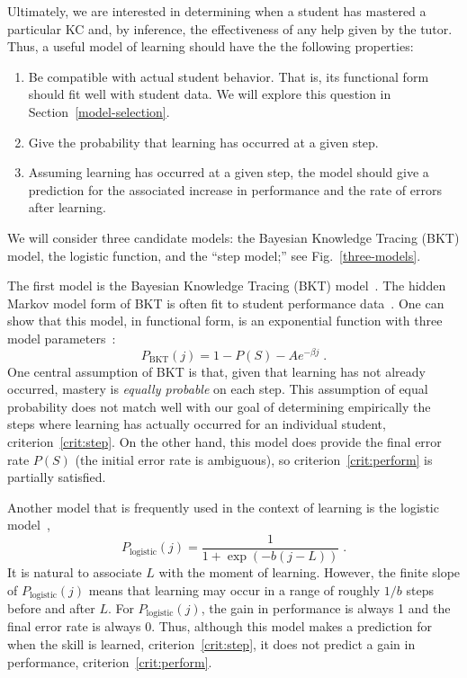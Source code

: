 \documentclass{edm_template}
\begin{document}
Ultimately, we are interested in determining when a student has mastered
a particular KC and, by inference, the effectiveness of
any help given by the tutor.  Thus, a useful model of learning
should  have the the following properties:
\label{model-criteria}
%
\begin{enumerate} 

\item Be compatible with actual student behavior.
      That is, its
      functional form should fit well with student data.
      We will explore this question in Section~\ref{model-selection}.  

\item \label{crit:step}
      Give the probability that learning has occurred at a given step.

\item  \label{crit:perform}
     Assuming learning has occurred at a given step, the model
     should give a prediction for the 
     associated increase in performance and 
     the rate of errors after learning.

\end{enumerate}
%
We will consider three candidate models:  
the Bayesian Knowledge Tracing (BKT) model, the logistic function,
and the ``step model;''
see Fig.~\ref{three-models}.



The first model is the Bayesian Knowledge Tracing (BKT) 
model~\cite{corbett_knowledge_1995}.  The hidden Markov model
form of BKT is often fit to student performance 
data~\cite{beck_identifiability:_2007}.  One can show that
this model, in functional form, is an exponential function
with three model parameters~\cite{van_de_sande_properties_2012}:
%
\begin{equation}
         P_\mathrm{BKT}(j) = 1-P(S) -A e^{-\beta j} \; .
\end{equation}
%
One central assumption of BKT is that, given that learning
has not already occurred, mastery is {\em equally probable} on each step.
This assumption of equal probability does not match well with 
our goal of determining empirically the steps where learning has 
actually occurred for an individual student, criterion~\ref{crit:step}.
On the other hand, this model does provide the final
error rate $P(S)$ (the initial error rate is ambiguous), 
so criterion~\ref{crit:perform} is partially satisfied. 

Another model that is frequently used in the context of learning is
the logistic model~\cite{cen_learning_2006,chi_instructional_2011},
%
\begin{equation}
    P_\mathrm{logistic}(j)= \frac{1}{1+\exp\left(-b (j-L)\right)} \; .
\end{equation}
%
It is natural to associate $L$ with the moment of learning.  However,
the finite slope of $P_\mathrm{logistic}(j)$ means that learning may
occur in a range of roughly $1/b$ steps before and after $L$.  For
$P_\mathrm{logistic}(j)$, the gain in performance is always 1 and the
final error rate is always 0.  Thus, although this model makes a
prediction for when the skill is learned, criterion~\ref{crit:step},
it does not predict a gain in performance,
criterion~\ref{crit:perform}.
\end{document}
